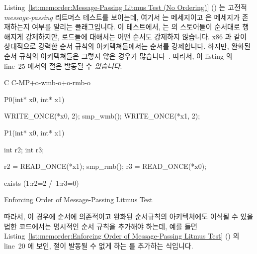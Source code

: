 Listing~\ref{lst:memorder:Message-Passing Litmus Test (No Ordering)}
()
는 고전적 \emph{message-passing} 리트머스 테스트를 보이는데, 여기서  는
메세지이고  은 메세지가 존재하는지 여부를 알리는 플래그입니다.
이 테스트에서,  는  의 스토어들이 순서대로 행해지게
강제하지만, 로드들에 대해서는 어떤 순서도 강제하지 않습니다.
x86 과 같이 상대적으로 강력한 순서 규칙의 아키텍쳐들에서는 순서를 강제합니다.
하지만, 완화된 순서 규칙의 아키텍쳐들은 그렇지 않은 경우가
많습니다~\cite{JadeAlglave2011ppcmem}.
따라서, 이 listing 의 line~25 에서의  절은 발동될 수
\emph{있습니다}.

\begin{listing}[tbp]
{ \scriptsize
\begin{verbbox}[\LstLineNo]
C C-MP+o-wmb-o+o-rmb-o

{
}

P0(int* x0, int* x1) {

  WRITE_ONCE(*x0, 2);
  smp_wmb();
  WRITE_ONCE(*x1, 2);

}

P1(int* x0, int* x1) {

  int r2;
  int r3;

  r2 = READ_ONCE(*x1);
  smp_rmb();
  r3 = READ_ONCE(*x0);

}

exists (1:r2=2 /\ 1:r3=0)
\end{verbbox}
}
\centering
\theverbbox
\caption{Enforcing Order of Message-Passing Litmus Test}
\label{lst:memorder:Enforcing Order of Message-Passing Litmus Test}
\end{listing}

따라서, 이 경우에 순서에 의존적이고 완화된 순서규칙의 아키텍쳐에도 이식될 수
있을 법한 코드에서는 명시적인 순서 규칙을 추가해야 하는데, 예를 들면
Listing~\ref{lst:memorder:Enforcing Order of Message-Passing Litmus Test}
()
의 line~20 에 보인,  절이 발동될 수 없게 하는  를
추가하는 식입니다.
\iffalse

